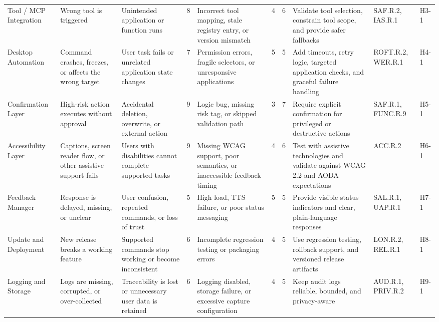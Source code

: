 \documentclass[12pt]{article}
\begin{document}
\begin{landscape}
\begin{longtable}{p{2.7cm} p{2.9cm} p{3.0cm} c p{3.2cm} c c p{4.0cm}
  p{2.2cm} p{1.5cm}}
Tool / MCP Integration &
Wrong tool is triggered &
Unintended application or function runs &
8 &
Incorrect tool mapping, stale registry entry, or version mismatch &
4 &
6 &
Validate tool selection, constrain tool scope, and provide safer
fallbacks &
SAF.R.2, IAS.R.1 &
H3-1 \\

Desktop Automation &
Command crashes, freezes, or affects the wrong target &
User task fails or unrelated application state changes &
7 &
Permission errors, fragile selectors, or unresponsive applications &
5 &
5 &
Add timeouts, retry logic, targeted application checks, and graceful
failure handling &
ROFT.R.2, WER.R.1 &
H4-1 \\

Confirmation Layer &
High-risk action executes without approval &
Accidental deletion, overwrite, or external action &
9 &
Logic bug, missing risk tag, or skipped validation path &
3 &
7 &
Require explicit confirmation for privileged or destructive actions &
SAF.R.1, FUNC.R.9 &
H5-1 \\

Accessibility Layer &
Captions, screen reader flow, or other assistive support fails &
Users with disabilities cannot complete supported tasks &
9 &
Missing WCAG support, poor semantics, or inaccessible feedback timing &
4 &
6 &
Test with assistive technologies and validate against WCAG 2.2 and
AODA expectations &
ACC.R.2 &
H6-1 \\

Feedback Manager &
Response is delayed, missing, or unclear &
User confusion, repeated commands, or loss of trust &
5 &
High load, TTS failure, or poor status messaging &
5 &
5 &
Provide visible status indicators and clear, plain-language responses &
SAL.R.1, UAP.R.1 &
H7-1 \\

Update and Deployment &
New release breaks a working feature &
Supported commands stop working or become inconsistent &
6 &
Incomplete regression testing or packaging errors &
4 &
5 &
Use regression testing, rollback support, and versioned release
artifacts &
LON.R.2, REL.R.1 &
H8-1 \\

Logging and Storage &
Logs are missing, corrupted, or over-collected &
Traceability is lost or unnecessary user data is retained &
6 &
Logging disabled, storage failure, or excessive capture
configuration &
4 &
5 &
Keep audit logs reliable, bounded, and privacy-aware &
AUD.R.1, PRIV.R.2 &
H9-1 \\


\end{longtable}
\end{landscape}
\end{document}
